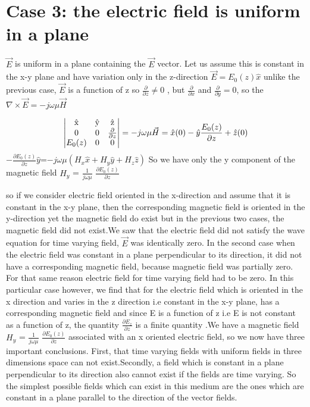 \section{Case 3: the electric field is uniform in a plane}
$\vec{E}$ is uniform in a plane containing the $\vec{E}$ vector. Let us assume this is constant in the x-y plane and have variation only in the z-direction $\vec{E}=E_{0}(z)\hat{x}$ unlike the previous case, $\vec{E}$ is a function of z so $\frac{\partial}{\partial z}\neq0$ , but  $\frac{\partial}{\partial x}$ and  $\frac{\partial}{\partial y}=0$, so the $\nabla\times\vec{E}=-j\omega\mu\vec{H}$

\begin{dmath*}
\begin{vmatrix}
$\^{x}$ & $\^{y}$ & $\^{z}$\\
0 & 0 & \pdv{}{z} \\
$$E_{0}(z)$$ & 0 & 0
\end{vmatrix}=-j\omega\mu\vec{H}=\hat{x}(0) - \hat{y}\frac{E_{0}(z)}{\partial z} + \hat{z}(0)
\end{dmath*}			
$-\frac{\partial E_{0}(z)}{\partial z}\hat{y}$=$-j\omega\mu(H_{x}\hat{x} + H_{y}\hat{y} + H_{z}\hat{z} )$
So we have only the y component of the magnetic field $H_{y}$ = $\frac{1}{j\omega\mu}$ $\frac{\partial E_{0}(z)}{\partial z}$

so if we consider electric field oriented in the x-direction and assume that it is constant in the x-y plane, then the corresponding magnetic field is oriented in the y-direction yet the magnetic field do exist but in the previous two cases, the magnetic field did not exist.We saw that the electric field did not satisfy the wave equation for time varying field, $\vec{E}$ was identically zero. In the second case when the electric field was constant in a plane perpendicular to its direction, it did not have a corresponding magnetic field, because magnetic field was partially zero. For that same reason electric field for time varying field had  to be zero.     
In this particular case however, we find that for the electric field which is oriented in the x direction and varies in the z direction i.e constant in the x-y plane, has a corresponding magnetic field and since E is a function of z i.e E is not constant as a function of z, the quantity $\frac{\partial {E_z}}{\partial {z}}$ is a finite quantity .We have a magnetic field $H_{y}$ = $\frac{1}{j\omega\mu}$ $\frac{\partial E_{0}(z)}{\partial z}$ associated with an x oriented electric field, so we now have three important conclusions. First, that time varying fields with uniform fields in three dimensions space can not exist.Secondly, a field which is constant in a plane perpendicular to its direction also cannot exist if the fields are time varying. So the simplest possible fields which can exist in this medium are the ones which are constant in a plane parallel to the direction of the vector fields.

